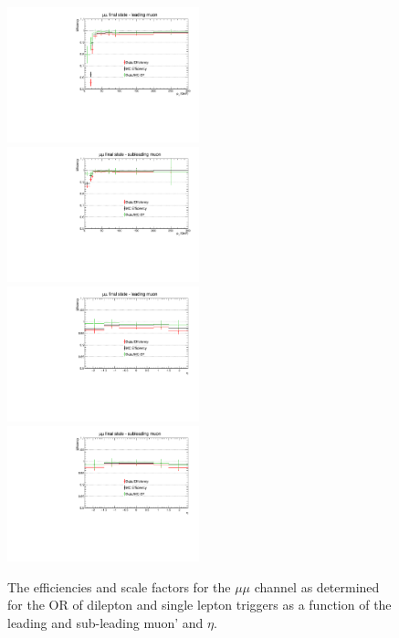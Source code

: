 \begin{figure}[ht]
\centering
\includegraphics[width=0.495\textwidth]{figs/background-estimation/triggerEfficiency/ttbar/muon1_pT_SF.pdf}
\includegraphics[width=0.495\textwidth]{figs/background-estimation/triggerEfficiency/ttbar/muon2_pT_SF.pdf}
\\
\includegraphics[width=0.495\textwidth]{figs/background-estimation/triggerEfficiency/ttbar/muon1_eta_SF.pdf}
\includegraphics[width=0.495\textwidth]{figs/background-estimation/triggerEfficiency/ttbar/muon2_eta_SF.pdf}
\caption{
The efficiencies and scale factors for the $\mu\mu$ channel as determined for the OR of dilepton and single lepton triggers as a function of the leading and sub-leading muon' \pT and $\eta$.
}
\label{fig:App_trigEff_mumu}
\end{figure}

